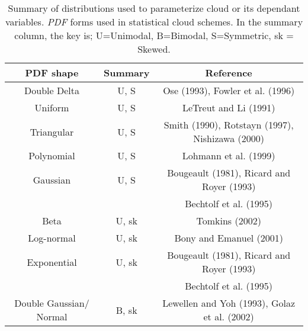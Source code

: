 \begin{table}[]
    \centering
    \setlength\tabcolsep{1.5pt} %
    \setlength\extrarowheight{-7pt}
    \begin{tabular}{c|c|c}
        PDF shape &  Summary & Reference \\ \hline
        Double Delta & U, S & Ose (1993), Fowler et al. (1996) \\
        Uniform & U, S & LeTreut and Li (1991) \\
        Triangular & U, S & Smith (1990), Rotstayn (1997), Nishizawa (2000) \\
        Polynomial & U, S & Lohmann et al. (1999) \\
        Gaussian & U, S & Bougeault (1981), Ricard and Royer (1993) \\ 
        & &  Bechtolf et al. (1995) \\
        Beta & U, sk & Tomkins (2002) \\
        Log-normal & U, sk & Bony and Emanuel (2001) \\ 
        Exponential &  U, sk & Bougeault (1981), Ricard and Royer (1993) \\
        & &  Bechtolf et al. (1995) \\
        Double Gaussian/ Normal & B, sk & Lewellen and Yoh (1993), Golaz et al. (2002)
    \end{tabular}
    \caption{Summary of distributions used to parameterize cloud or its dependant variables. \textit{PDF} forms used in statistical cloud schemes. In the summary column, the key is; U=Unimodal, B=Bimodal, S=Symmetric, sk = Skewed.}
    \label{tab:summary_PDF}
\end{table}